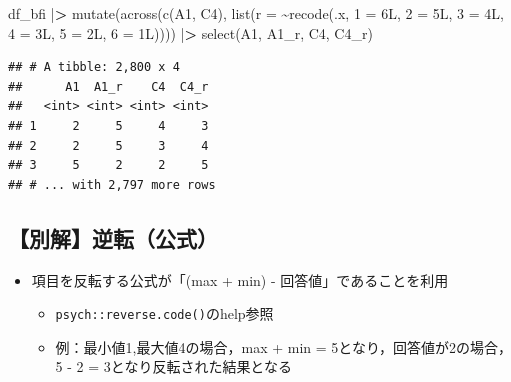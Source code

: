\documentclass[
  xelatex,ja=standard, b5paper]{bxjsbook}
\newenvironment{Shaded}{\begin{snugshade}}{\end{snugshade}}
\newcommand{\AttributeTok}[1]{\textcolor[rgb]{0.77,0.63,0.00}{#1}}
\newcommand{\ErrorTok}[1]{\textcolor[rgb]{0.64,0.00,0.00}{\textbf{#1}}}
\newcommand{\FunctionTok}[1]{\textcolor[rgb]{0.00,0.00,0.00}{#1}}
\newcommand{\NormalTok}[1]{#1}
\newcommand{\OtherTok}[1]{\textcolor[rgb]{0.56,0.35,0.01}{#1}}
\newcommand{\SpecialCharTok}[1]{\textcolor[rgb]{0.00,0.00,0.00}{#1}}
\newcommand{\StringTok}[1]{\textcolor[rgb]{0.31,0.60,0.02}{#1}}
\providecommand{\tightlist}{%
  \setlength{\itemsep}{0pt}\setlength{\parskip}{0pt}}
\begin{document}
\begin{Shaded}
\begin{Highlighting}[]
\NormalTok{df\_bfi }\SpecialCharTok{|}\ErrorTok{\textgreater{}} 
  \FunctionTok{mutate}\NormalTok{(}\FunctionTok{across}\NormalTok{(}\FunctionTok{c}\NormalTok{(A1, C4),}
                \FunctionTok{list}\NormalTok{(}\AttributeTok{r =} \SpecialCharTok{\textasciitilde{}}\FunctionTok{recode}\NormalTok{(.x, }\StringTok{\textasciigrave{}}\AttributeTok{1}\StringTok{\textasciigrave{}} \OtherTok{=}\NormalTok{ 6L, }\StringTok{\textasciigrave{}}\AttributeTok{2}\StringTok{\textasciigrave{}} \OtherTok{=}\NormalTok{ 5L, }\StringTok{\textasciigrave{}}\AttributeTok{3}\StringTok{\textasciigrave{}} \OtherTok{=}\NormalTok{ 4L, }
                                     \StringTok{\textasciigrave{}}\AttributeTok{4}\StringTok{\textasciigrave{}} \OtherTok{=}\NormalTok{ 3L, }\StringTok{\textasciigrave{}}\AttributeTok{5}\StringTok{\textasciigrave{}} \OtherTok{=}\NormalTok{ 2L, }\StringTok{\textasciigrave{}}\AttributeTok{6}\StringTok{\textasciigrave{}} \OtherTok{=}\NormalTok{ 1L)))) }\SpecialCharTok{|}\ErrorTok{\textgreater{}} 
  \FunctionTok{select}\NormalTok{(A1, A1\_r, C4, C4\_r)}
\end{Highlighting}
\end{Shaded}

\begin{verbatim}
## # A tibble: 2,800 x 4
##      A1  A1_r    C4  C4_r
##   <int> <int> <int> <int>
## 1     2     5     4     3
## 2     2     5     3     4
## 3     5     2     2     5
## # ... with 2,797 more rows
\end{verbatim}

\hypertarget{mu-rev-rule1}{%
\subsection{【別解】逆転（公式）}\label{mu-rev-rule1}}

\begin{itemize}
\tightlist
\item
  項目を反転する公式が「(max + min) - 回答値」であることを利用

  \begin{itemize}
  \tightlist
  \item
    \texttt{psych::reverse.code()}のhelp参照
  \item
    例：最小値1,最大値4の場合，max + min = 5となり，回答値が2の場合，5 - 2 = 3となり反転された結果となる
  \end{itemize}
\end{itemize}
\end{document}
